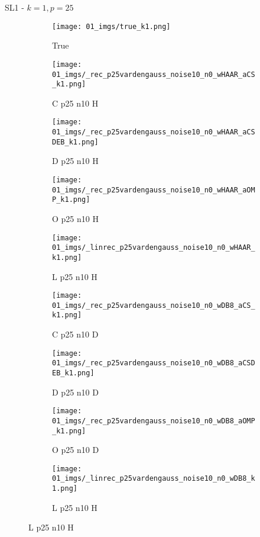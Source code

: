 \begin{frame}{SL1 - $k=1,p=25$}{}
\begin{figure}
\begin{subfigure}{0.1\textwidth}
\texttt{[image: 01\_imgs/true\_k1.png]}
\caption*{\Tiny True}
\end{subfigure}
\begin{subfigure}{0.1\textwidth}
\texttt{[image: 01\_imgs/\_rec\_p25vardengauss\_noise10\_n0\_wHAAR\_aCS\_k1.png]}
\caption*{\Tiny C p25 n10 H}
\end{subfigure}
\begin{subfigure}{0.1\textwidth}
\texttt{[image: 01\_imgs/\_rec\_p25vardengauss\_noise10\_n0\_wHAAR\_aCSDEB\_k1.png]}
\caption*{\Tiny D p25 n10 H}
\end{subfigure}
\begin{subfigure}{0.1\textwidth}
\texttt{[image: 01\_imgs/\_rec\_p25vardengauss\_noise10\_n0\_wHAAR\_aOMP\_k1.png]}
\caption*{\Tiny O p25 n10 H}
\end{subfigure}
\begin{subfigure}{0.1\textwidth}
\texttt{[image: 01\_imgs/\_linrec\_p25vardengauss\_noise10\_n0\_wHAAR\_k1.png]}
\caption*{\Tiny L p25 n10 H}
\end{subfigure}
\begin{subfigure}{0.1\textwidth}
\texttt{[image: 01\_imgs/\_rec\_p25vardengauss\_noise10\_n0\_wDB8\_aCS\_k1.png]}
\caption*{\Tiny C p25 n10 D}
\end{subfigure}
\begin{subfigure}{0.1\textwidth}
\texttt{[image: 01\_imgs/\_rec\_p25vardengauss\_noise10\_n0\_wDB8\_aCSDEB\_k1.png]}
\caption*{\Tiny D p25 n10 D}
\end{subfigure}
\begin{subfigure}{0.1\textwidth}
\texttt{[image: 01\_imgs/\_rec\_p25vardengauss\_noise10\_n0\_wDB8\_aOMP\_k1.png]}
\caption*{\Tiny O p25 n10 D}
\end{subfigure}
\begin{subfigure}{0.1\textwidth}
\texttt{[image: 01\_imgs/\_linrec\_p25vardengauss\_noise10\_n0\_wDB8\_k1.png]}
\caption*{\Tiny L p25 n10 H}
\end{subfigure}

\vspace{5pt}


\end{figure}
\end{frame}
